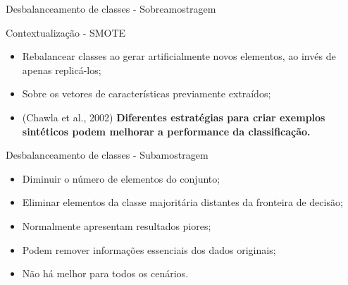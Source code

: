 \documentclass{beamer}
\begin{document}
\begin{frame}{Desbalanceamento de classes - Sobreamostragem}
\end{frame}
\begin{frame}{Contextualização - SMOTE}
\justifying
    \begin{itemize}
        \item Rebalancear classes ao gerar artificialmente novos elementos, ao invés de apenas replicá-los;
        \item Sobre os vetores de características previamente extraídos;
        \item (Chawla et al., 2002) \textbf{Diferentes estratégias para criar exemplos sintéticos podem melhorar a performance da classificação.}
    \end{itemize}
\end{frame}
\begin{frame}{Desbalanceamento de classes - Subamostragem}
    \begin{itemize}
        \item Diminuir o número de elementos do conjunto;
        \item Eliminar elementos da classe majoritária distantes da fronteira de decisão;
        \item Normalmente apresentam resultados piores;
        \item Podem remover informações essenciais dos dados originais;
        \item Não há melhor para todos os cenários.
    \end{itemize}

\end{frame}
\end{document}
